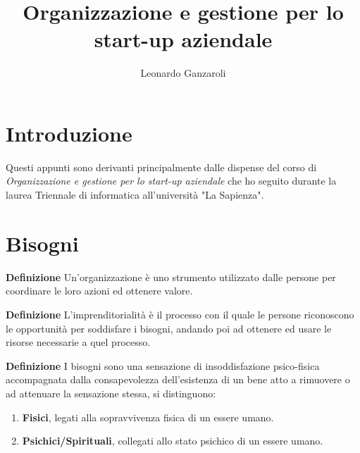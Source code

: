 \documentclass{article}
\title{Organizzazione e gestione per lo start-up aziendale}
\author{Leonardo Ganzaroli}
\date{}
\newcommand{\df}{\noindent\textbf{Definizione }}
\begin{document}
\maketitle


\tableofcontents

\newpage

\hypersetup{allcolors=black}

\section*{Introduzione}

Questi appunti sono derivanti principalmente dalle dispense del corso di \textit{Organizzazione e gestione per lo start-up aziendale} che ho seguito durante la laurea Triennale di informatica all'università "La Sapienza".

\newpage

\section{Bisogni}

\df Un'organizzazione è uno strumento utilizzato dalle persone per coordinare le loro azioni ed ottenere valore.\newline

\df L'imprenditorialità è il processo con il quale le persone riconoscono le opportunità per soddisfare i bisogni, andando poi ad ottenere ed usare le risorse necessarie a quel processo.\newline

\df I bisogni sono una sensazione di insoddisfazione psico-fisica accompagnata dalla consapevolezza dell’esistenza di un bene atto a rimuovere o ad attenuare la sensazione stessa, si distinguono:
\begin{enumerate}
    \item \textbf{Fisici}, legati alla sopravvivenza fisica di un essere umano.
    \item \textbf{Psichici/Spirituali}, collegati allo stato psichico di un essere umano.
\end{enumerate}
\end{document}
